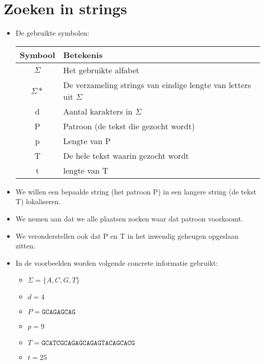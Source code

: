 \newcommand{\nonterminal}[1]{
    \langle \textbf{#1} \rangle
}

\newcommand{\m}[1]{
    {\color{OliveGreen}\hspace{0.1cm}\bf#1}
}

\newcommand{\um}[1]{
    {\color{YellowOrange}\hspace{0.1cm}\bf#1}
}

\newcommand{\nm}[1]{
    {\color{Maroon}\hspace{0.1cm}\bf#1}
}
\chapter{Zoeken in strings}
\label{ch:zoeken_in_strings}
\begin{itemize}
    \item De gebruikte symbolen:

    \begin{table}[ht]
        \centering
        \begin{tabular}{c l}
            \hline
            Symbool & Betekenis \\
            \hline
            $\Sigma$ & Het gebruikte alfabet \\
            $\Sigma*$ & De verzameling strings van eindige lengte van letters uit $\Sigma$ \\
            d & Aantal karakters in $\Sigma$ \\
            P & Patroon (de tekst die gezocht wordt) \\
            p & Lengte van P \\
            T & De hele tekst waarin gezocht wordt\\
            t & lengte van T \\
            \hline
        \end{tabular}
    \end{table}

    \item We willen een bepaalde string (het patroon P) in een langere string (de tekst T) lokaliseren.
    \item We nemen aan dat we alle plaatsen zoeken waar dat patroon voorkoomt.
    \item We veronderstellen ook dat P en T in het inwendig geheugen opgeslaan zitten.

    \item In de voorbeelden worden volgende concrete informatie gebruikt:
    \begin{itemize}
        \item $\Sigma = \{A, C, G, T\}$
        \item $d = 4$
        \item $P = \texttt{GCAGAGCAG}$
        \item $p = 9$
        \item $T = \texttt{GCATCGCAGAGCAGAGTACAGCACG}$
        \item $t = 25$
    \end{itemize}

\end{itemize}



